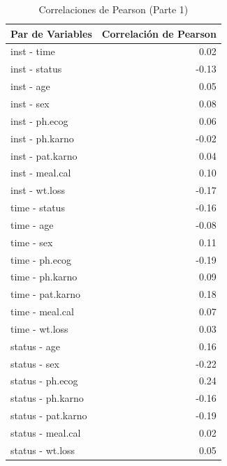 \documentclass[a4paper,12pt]{article}
\begin{document}
\begin{table}[h!]
    \centering
    \small
    \begin{tabular}{|l|r|}
        \hline
        \textbf{Par de Variables} & \textbf{Correlación de Pearson} \\
        \hline
        inst - time & 0.02 \\
        inst - status & -0.13 \\
        inst - age & 0.05 \\
        inst - sex & 0.08 \\
        inst - ph.ecog & 0.06 \\
        inst - ph.karno & -0.02 \\
        inst - pat.karno & 0.04 \\
        inst - meal.cal & 0.10 \\
        inst - wt.loss & -0.17 \\
        time - status & -0.16 \\
        time - age & -0.08 \\
        time - sex & 0.11 \\
        time - ph.ecog & -0.19 \\
        time - ph.karno & 0.09 \\
        time - pat.karno & 0.18 \\
        time - meal.cal & 0.07 \\
        time - wt.loss & 0.03 \\
        status - age & 0.16 \\
        status - sex & -0.22 \\
        status - ph.ecog & 0.24 \\
        status - ph.karno & -0.16 \\
        status - pat.karno & -0.19 \\
        status - meal.cal & 0.02 \\
        status - wt.loss & 0.05 \\
        \hline
    \end{tabular}
    \caption{Correlaciones de Pearson (Parte 1)}
    \label{tab:correlaciones_pearson1}
\end{table}
\end{document}
